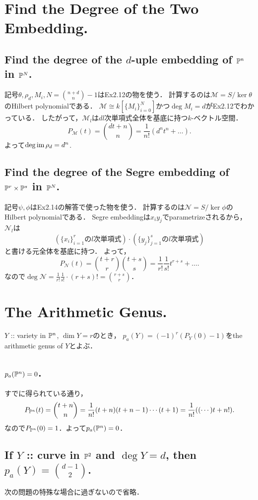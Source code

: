 \documentclass[a4paper]{jsarticle}
\begin{document}
\section{Find the Degree of the Two Embedding.} %
    \subsection{Find the degree of the $d$-uple embedding of $\mathbb{P}^n$ in $\mathbb{P}^N$.}
    記号$\theta, \rho_d, M_i, N=\binom{n+d}{n}-1$はEx2.12の物を使う．
    計算するのは$\mathcal{M}=S/\ker \theta$のHilbert polynomialである．
    $\mathcal{M} \cong k[\{M_i\}_{i=0}^{N}]$かつ$\deg M_i=d$がEx2.12でわかっている．
    したがって，$\mathcal{M}_l$は$dl$次単項式全体を基底に持つ$k$-ベクトル空間．
    \[ P_{\mathcal{M}}(t)=\binom{dt+n}{n}=\frac{1}{n!}(d^nt^n+\dots). \]
    よって$\deg \operatorname{im} \rho_d=d^n$.

    \subsection{Find the degree of the Segre embedding of $\mathbb{P}^r \times \mathbb{P}^s$ in $\mathbb{P}^N$.}
    記号$\psi, \phi$はEx2.14の解答で使った物を使う．
    計算するのは$\mathcal{N}=S/\ker \phi$のHilbert polynomialである．
    Segre embeddingは$x_i y_j$でparametrizeされるから，
    $\mathcal{N}_{l}$は
    \[ \left(\{x_i\}_{i=1}^r\text{の$l$次単項式}\right) \cdot \left(\{y_j\}_{j=1}^s\text{の$l$次単項式}\right) \]
    と書ける元全体を基底に持つ．
    よって，
    \[ P_{\mathcal{N}}(t)=\binom{t+r}{r}\binom{t+s}{s}=\frac{1}{r!} \frac{1}{s!}t^{r+s}+\dots. \]
    なので$\deg \mathcal{N}=\frac{1}{r!} \frac{1}{s!} \cdot (r+s)!=\binom{r+s}{r}$．

\section{The Arithmetic Genus.} %
    $Y$ :: variety in $\mathbb{P}^n$, $\dim Y=r$のとき，
    $p_a(Y)=(-1)^r (P_Y(0)-1)$をthe arithmetic genus of $Y$とよぶ．

    \subsection{$p_a(\mathbb{P}^n)=0$.}
    すでに得られている通り，
    \[ P_{\mathbb{P}^n}(t)=\binom{t+n}{n}=\frac{1}{n!}(t+n)(t+n-1)\cdots(t+1)=\frac{1}{n!}((\cdots)t+n!). \]
    なので$P_{\mathbb{P}^n}(0)=1$．よって$p_a(\mathbb{P}^n)=0$．
    
    \subsection{If $Y$ :: curve in $\mathbb{P}^2$ and $\deg Y=d$, then $p_a(Y)=\binom{d-1}{2}$.}
    次の問題の特殊な場合に過ぎないので省略．
\end{document}

